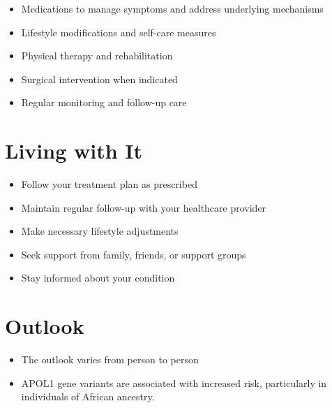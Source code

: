 \begin{itemize}[noitemsep]
  \item Medications to manage symptoms and address underlying mechanisms
  \item Lifestyle modifications and self-care measures
  \item Physical therapy and rehabilitation
  \item Surgical intervention when indicated
  \item Regular monitoring and follow-up care
\end{itemize}
\section{Living with It}
\begin{itemize}[noitemsep]
  \item Follow your treatment plan as prescribed
  \item Maintain regular follow-up with your healthcare provider
  \item Make necessary lifestyle adjustments
  \item Seek support from family, friends, or support groups
  \item Stay informed about your condition
\end{itemize}
\section{Outlook}
\begin{itemize}[noitemsep]
  \item The outlook varies from person to person
  \item APOL1 gene variants are associated with increased risk, particularly in individuals of African ancestry.
\end{itemize}
